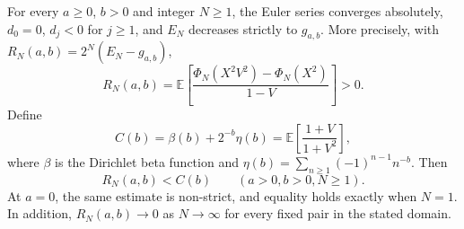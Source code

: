 \begin{theorem}
\label{newEuler:thm:domination}
For every $a\ge0$, $b>0$ and integer $N\ge1$, the Euler series
converges absolutely, $d_0=0$, $d_j<0$ for $j\ge1$, and
$E_N$ decreases strictly to $g_{a,b}$. More precisely, with
$R_N(a,b)=2^N(E_N-g_{a,b})$,
\begin{equation}\label{newEuler:eq:R}
 R_N(a,b)=\mathbb E\!\left[
 \frac{\Phi_N(X^2V^2)-\Phi_N(X^2)}{1-V}\right]>0.
\end{equation}
Define
\begin{equation}\label{newEuler:eq:C}
 C(b)=\beta(b)+2^{-b}\eta(b)
     =\mathbb E\!\left[\frac{1+V}{1+V^2}\right],
\end{equation}
where $\beta$ is the Dirichlet beta function and
$\eta(b)=\sum_{n\ge1}(-1)^{n-1}n^{-b}$. Then
\begin{equation}\label{newEuler:eq:fixedb}
 R_N(a,b)<C(b)\qquad(a>0,b>0,N\ge1).
\end{equation}
At $a=0$, the same estimate is non-strict, and equality holds exactly
when $N=1$. In addition, $R_N(a,b)\to0$ as $N\to\infty$ for every
fixed pair in the stated domain.
\end{theorem}
